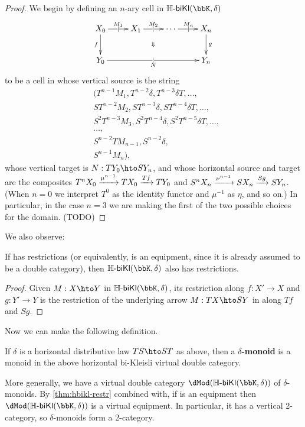\documentclass{amsart}
\newcommand{\K}{\bbK}
\newcommand{\Hbikl}[2]{\mathbb{H}\text{-}\mathsf{biKl}(#1,#2)}
\let\Mod\dMod
\begin{document}
\begin{proof}
  We begin by defining an $n$-ary cell in $\Hbikl\K\delta$
  \[ \xymatrix{ X_0 \ar[r]|{|}^{M_1} \ar[d]_f \ar@{}[drrr]|{\Downarrow} &
    X_1 \ar[r]|{|}^{M_2} &
    \cdots\ar[r]|{|}^{M_n} &
    X_n \ar[d]^g \\
    Y_0 \ar[rrr]|{|}_{N} &&& Y_n}\]
 to be a cell in \K whose vertical source is the string
  \begin{align*}
    &(T^{n-1}M_1,T^{n-2}\delta,T^{n-3}\delta T,\dots,\\
    &S T^{n-2} M_2,S T^{n-3}\delta, ST^{n-4}\delta T, \dots,\\
    &S^2 T^{n-3} M_3, S^2 T^{n-4}\delta, S^2T^{n-5}\delta T, \dots,\\
    &\dots,\\
    &S^{n-2} T M_{n-1}, S^{n-2}\delta,\\
    & S^{n-1} M_n),
  \end{align*}
  whose vertical target is $N:TY_0 \hto SY_n$, and whose horizontal source and target are the composites $T^n X_0 \xrightarrow{\mu^{n-1}} T X_0 \xrightarrow{T f} TY_0$ and $S^n X_n \xrightarrow{\nu^{n-1}} S X_n \xrightarrow{S g} SY_n$.
  (When $n=0$ we interpret $T^0$ as the identity functor and $\mu^{-1}$ as $\eta$, and so on.)
  In particular, in the case $n=3$ we are making the first of the two possible choices for the domain.
  (TODO)
\end{proof}

We also observe:

\begin{lem}\label{thm:hbikl-restr}
  If \K has restrictions (or equivalently, is an equipment, since it is already assumed to be a double category), then $\Hbikl\K\delta$ also has restrictions.
\end{lem}
\begin{proof}
  Given $M:X\hto Y$ in $\Hbikl\K\delta$, its restriction along $f:X'\to X$ and $g:Y'\to Y$ is the restriction of the underlying arrow $M:TX \hto SY$ in \K along $T f$ and $S g$.
\end{proof}

Now we can make the following definition.

\begin{defn}
  If $\delta$ is a horizontal distributive law $TS \hto ST$ as above, then a \textbf{$\delta$-monoid} is a monoid in the above horizontal bi-Kleisli virtual double category.
\end{defn}

More generally, we have a virtual double category $\Mod(\Hbikl\K\delta)$ of $\delta$-monoids.
By \cref{thm:hbikl-restr} combined with\cite[Propositions 5.5 and 7.4]{cs:multicats}, if \K  is an equipment then $\Mod(\Hbikl\K\delta)$ is a virtual equipment.
In particular, it has a vertical 2-category, so $\delta$-monoids form a 2-category.
\end{document}
